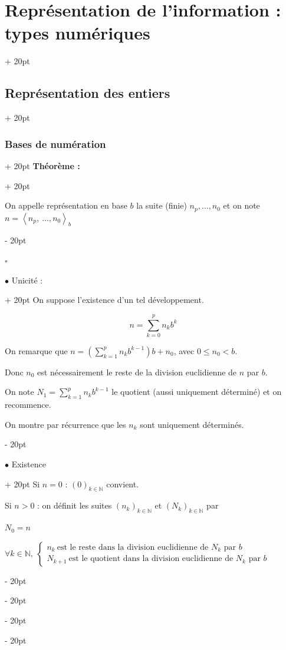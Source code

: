 \documentclass[a4paper, 12pt, twoside]{article}
\newcommand{\N}{\mathbb{N}} %
\newcommand{\lr}[1]{\left( #1 \right)}
\newcommand{\lrangle}[1]{\left\langle #1 \right\rangle}
\newcommand{\ind}[1][20pt]{\advance\leftskip + #1}
\newcommand{\deind}[1][20pt]{\advance\leftskip - #1}
\newenvironment{indentedenv}[1][20pt]{\par \ind[#1]}{\par \deind}
\newenvironment{indt}[2][20pt]{#2 \begin{indentedenv}[#1]}{\end{indentedenv}} %
\begin{document}
\begin{indt}{\section{Représentation de l'information : types numériques}}
\begin{indt}{\subsection{Représentation des entiers}}
\begin{indt}{\subsubsection{Bases de numération}}
\begin{indt}{\textbf{Théorème :}}
                    \vspace{12pt}
                    
                    On appelle représentation en base $b$ la suite (finie) $n_p, \ldots, n_0$ et on note $n = \lrangle{n_p,\ \ldots, n_0}_b$
                \end{indt}
                    
                \vspace{12pt}
                
                $\square$
                
                \begin{indt}{$\bullet$ Unicité :}
                    On suppose l'existence d'un tel développement.
                    
                    \[ n = \sum_{k = 0}^p n_k b^k \]
                    
                    On remarque que $\displaystyle n = \lr{\sum_{k = 1}^p n_k b^{k - 1}}b + n_0$, avec $0 \le n_0 < b$.
                    
                    Donc $n_0$ est nécessairement le reste de la division euclidienne de $n$ par $b$.
                    
                    On note $\displaystyle N_1 = \sum_{k = 1}^p n_k b^{k - 1}$ le quotient (aussi uniquement déterminé) et on recommence.
                    
                    On montre par récurrence que les $n_k$ sont uniquement déterminés.
                \end{indt}
                
                \vspace{12pt}
                
                \begin{indt}{$\bullet$ Existence}
                    Si $n = 0$ : $(0)_{k \in \N}$ convient.
                    
                    Si $n > 0$ : on définit les suites $(n_k)_{k \in \N}$ et $(N_k)_{k \in \N}$ par
                    
                    $N_0 = n$
                    
                    $
                        \forall k \in \N,\ 
                        \begin{cases}
                            n_k\ \text{est le reste dans la division euclidienne de $N_k$ par $b$}
                            \\
                            N_{k + 1}\ \text{est le quotient dans la division euclidienne de $N_k$ par $b$}
                        \end{cases}
                    $
                    

\end{indt}
\end{indt}
\end{indt}
\end{indt}
\end{document}
